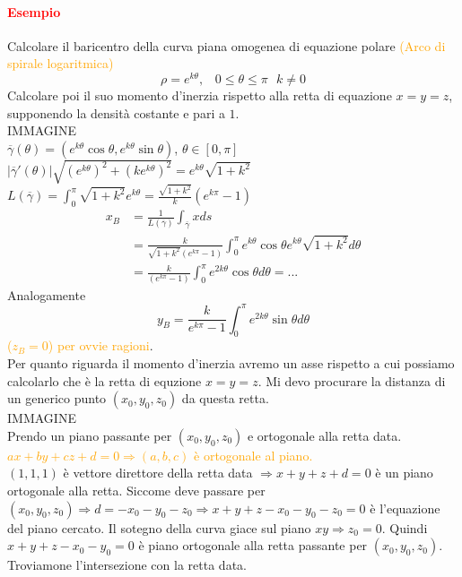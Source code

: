 \documentclass{article}
\begin{document}
\paragraph{\textcolor{red}{Esempio}}
Calcolare il baricentro della curva piana omogenea di equazione polare \textcolor{orange}{(Arco di spirale logaritmica)}
\begin{equation*}
    \rho=e^{k\theta}, \,\,\,\, \, 0 \leq \theta \leq \pi\,\,\,\, k \neq 0
\end{equation*}
Calcolare poi il suo momento d'inerzia rispetto alla retta di equazione $x=y=z$, supponendo la densità costante e pari a $1$.\\
IMMAGINE\\
$\overline{\gamma}(\theta)=(e^{k\theta}\cos \theta, e^{k\theta}\sin \theta)$, $\theta \in [0,\pi]$\\
$|\overline{\gamma}'(\theta)|\sqrt{(e^{k\theta})^2+(ke^{k\theta})^2}=e^{k\theta}\sqrt{1+k^2}$\\
$L(\overline{\gamma})=\int_0^{\pi} \sqrt{1+k^2}e^{k\theta}=\frac{\sqrt{1+k^2}}{k}(e^{k\pi}-1)$
\begin{align*}
    x_B&=\frac{1}{L(\overline{\gamma})}\int_{\overline{\gamma}} x ds\\
    &= \frac{k}{\sqrt{1+k^2}(e^{k\pi}-1)}\int_0^\pi e^{k\theta} \cos \theta e^{k\theta}\sqrt{1+k^2}d\theta\\
    &=\frac{k}{(e^{k\pi}-1)}\int_0^\pi e^{2k\theta} \cos \theta d \theta=...
\end{align*}
Analogamente
\begin{equation*}
    y_B= \frac{k}{e^{k\pi}-1}\int_0^\pi e^{2k \theta} \sin \theta d \theta
\end{equation*}
\textcolor{orange}{($z_B=0$) per ovvie ragioni}.\\
Per quanto riguarda il momento d'inerzia avremo un asse rispetto a cui possiamo calcolarlo che è la retta di equzione $x=y=z$. Mi devo procurare la distanza di un generico punto $(x_0,y_0,z_0)$ da questa retta.\\
IMMAGINE\\
Prendo un piano passante per $(x_0,y_0,z_0)$ e ortogonale alla retta data. \\
\textcolor{orange}{$ax+by+cz+d=0 \Rightarrow (a,b,c)$ è ortogonale al piano.}\\
$(1,1,1)$ è vettore direttore della retta data $\Rightarrow x+y+z+d=0$ è un piano ortogonale alla retta. Siccome deve passare per $(x_0,y_0,z_0) \Rightarrow d= -x_0-y_0-z_0 \Rightarrow x+y+z-x_0-y_0-z_0=0$ è l'equazione del piano cercato. Il sotegno della curva giace sul piano $xy \Rightarrow z_0=0$. Quindi $x+y+z-x_0-y_0=0$ è piano ortogonale alla retta passante per $(x_0,y_0,z_0)$. Troviamone l'intersezione con la retta data. \\
\end{document}
